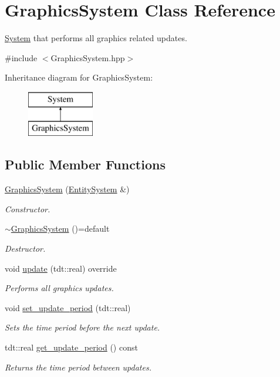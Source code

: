 \hypertarget{class_graphics_system}{}\section{Graphics\+System Class Reference}
\label{class_graphics_system}


\hyperlink{class_system}{System} that performs all graphics related updates.  




{\ttfamily \#include $<$Graphics\+System.\+hpp$>$}

Inheritance diagram for Graphics\+System\+:\begin{figure}[H]
\begin{center}
\leavevmode
\includegraphics[height=2.000000cm]{class_graphics_system}
\end{center}
\end{figure}
\subsection*{Public Member Functions}
\begin{DoxyCompactItemize}
\item 
\hyperlink{class_graphics_system_a7cac5e6ce0eeb67c1681ffa1f324899d}{Graphics\+System} (\hyperlink{class_entity_system}{Entity\+System} \&)
\begin{DoxyCompactList}\small\item\em Constructor. \end{DoxyCompactList}\item 
\hyperlink{class_graphics_system_a85a733ce82a83bce52c437afb4ebd831}{$\sim$\+Graphics\+System} ()=default
\begin{DoxyCompactList}\small\item\em Destructor. \end{DoxyCompactList}\item 
void \hyperlink{class_graphics_system_a1b5bf7d5928bcc00d90dec8be3866440}{update} (tdt\+::real) override
\begin{DoxyCompactList}\small\item\em Performs all graphics updates. \end{DoxyCompactList}\item 
void \hyperlink{class_graphics_system_ad3138967c974573a11cc486d4718978c}{set\+\_\+update\+\_\+period} (tdt\+::real)
\begin{DoxyCompactList}\small\item\em Sets the time period before the next update. \end{DoxyCompactList}\item 
tdt\+::real \hyperlink{class_graphics_system_afef3488931bd206c0fd89237d1d23f43}{get\+\_\+update\+\_\+period} () const 
\begin{DoxyCompactList}\small\item\em Returns the time period between updates. \end{DoxyCompactList}\end{DoxyCompactItemize}
